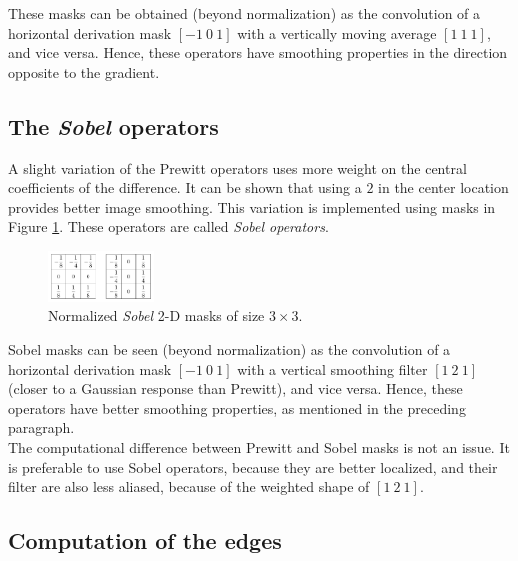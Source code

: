 \documentclass{ipol}
\numberwithin{equation}{section}
\numberwithin{table}{section}
\numberwithin{figure}{section}
\begin{document}
These masks can be obtained (beyond normalization) as the convolution of a horizontal derivation mask 
$[-1\ 0\ 1]$ with a vertically moving average $[1\ 1\ 1]$, and vice versa. Hence, these operators have 
smoothing properties in the direction opposite to the gradient.


\subsection{The \textit{Sobel} operators}

A slight variation of the Prewitt operators uses more weight on the central coefficients of the 
difference. It can be shown that using a $2$ in the center location provides better image smoothing. This
variation is implemented using masks in Figure \ref{fig:sobel}. These operators are called 
\textit{Sobel operators}. \\

\begin{figure}
	\centering
	\includegraphics[width=0.25\textwidth]{sobel_n.pdf}
	\caption{Normalized \textit{Sobel} 2-D masks of size $3\times3$.}
	\label{fig:sobel}
\end{figure}

Sobel masks can be seen (beyond normalization) as the convolution of a horizontal derivation mask 
$[-1\ 0\ 1]$ with a vertical smoothing filter $[1\ 2\ 1]$ (closer to a Gaussian response than Prewitt), and vice versa. 
Hence, these operators have better smoothing properties, as mentioned in the preceding paragraph. \\

The computational difference between Prewitt and Sobel masks is not an issue. It is preferable to 
use Sobel operators, because they are better localized, and their filter are also less aliased, 
because of the weighted shape of $[1\ 2\ 1]$.


\subsection{Computation of the edges}
\end{document}
